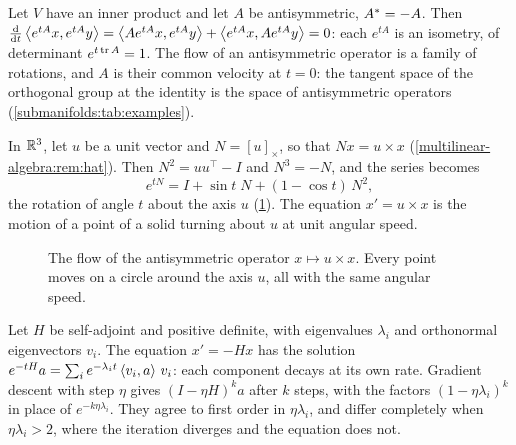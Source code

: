 \begin{notechapter}
\begin{example}[Rotations]\label{odes-flows:ex:rotations}
Let $V$ have an inner product and let $A$ be antisymmetric,
$A^{*} = -A$. Then
$\frac{\mathrm{d}}{\mathrm{d} t}\left\langle e^{tA}x, e^{tA}y \right\rangle
= \left\langle Ae^{tA}x, e^{tA}y \right\rangle + \left\langle e^{tA}x, Ae^{tA}y \right\rangle = 0$: each
$e^{tA}$ is an isometry, of determinant $e^{t\operatorname{tr} A} = 1$. The flow of
an antisymmetric operator is a family of rotations, and $A$ is their
common velocity at $t = 0$: the tangent space of the orthogonal group
at the identity is the space of antisymmetric operators
(\cref{submanifolds:tab:examples}).

In $\mathbb{R}^3$, let $u$ be a unit vector and $N = [u]_\times$, so that
$Nx = u\times x$ (\cref{multilinear-algebra:rem:hat}). Then
$N^2 = uu^\top - I$ and $N^3 = -N$, and the series becomes
\[
  e^{tN} = I + \sin t\;N + (1 - \cos t)\,N^2 ,
\]
the rotation of angle $t$ about the axis $u$
(\cref{odes-flows:fig:rotation}). The equation $x' = u\times x$ is the
motion of a point of a solid turning about $u$ at unit angular speed.
\end{example}

\begin{figure}[ht]
\centering
{}
\caption{The flow of the antisymmetric operator $x\mapsto u\times x$.
Every point moves on a circle around the axis $u$, all with the same
angular speed.}
\label{odes-flows:fig:rotation}
\end{figure}

\begin{example}\label{odes-flows:ex:quadratic}
Let $H$ be self-adjoint and positive definite, with eigenvalues
$\lambda_i$ and orthonormal eigenvectors $v_i$. The equation
$x' = -Hx$ has the solution
$e^{-tH}a = \sum_ie^{-\lambda_it}\left\langle v_i, a \right\rangle\,v_i$: each component
decays at its own rate. Gradient descent with step $\eta$ gives
$(I - \eta H)^ka$ after $k$ steps, with the factors
$(1 - \eta\lambda_i)^k$ in place of $e^{-k\eta\lambda_i}$. They agree
to first order in $\eta\lambda_i$, and differ completely when
$\eta\lambda_i > 2$, where the iteration diverges and the equation
does not.
\end{example}


\end{notechapter}
